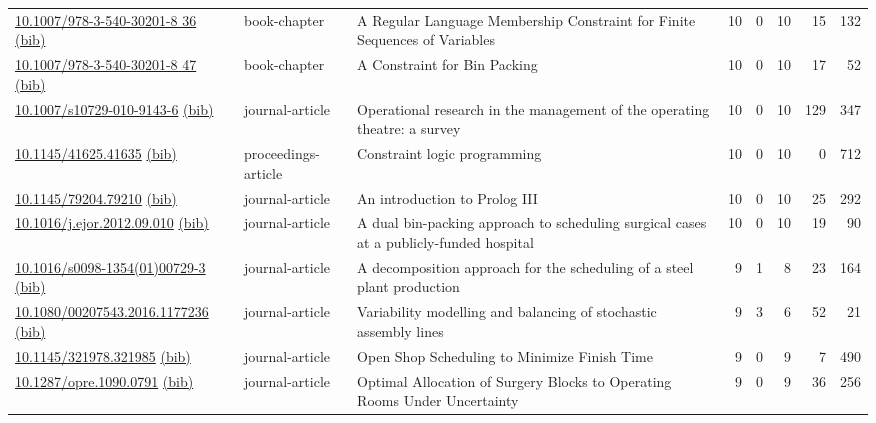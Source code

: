 {\begin{longtable}{p{5cm}lp{11cm}rrrrr}
\href{http://dx.doi.org/10.1007/978-3-540-30201-8_36}{10.1007/978-3-540-30201-8 36} \href{https://www.doi2bib.org/bib/10.1007/978-3-540-30201-8_36}{(bib)} & book-chapter & A Regular Language Membership Constraint for Finite Sequences of Variables & 10 & 0 & 10 & 15 & 132 \\
\href{http://dx.doi.org/10.1007/978-3-540-30201-8_47}{10.1007/978-3-540-30201-8 47} \href{https://www.doi2bib.org/bib/10.1007/978-3-540-30201-8_47}{(bib)} & book-chapter & A Constraint for Bin Packing & 10 & 0 & 10 & 17 & 52 \\
\href{http://dx.doi.org/10.1007/s10729-010-9143-6}{10.1007/s10729-010-9143-6} \href{https://www.doi2bib.org/bib/10.1007/s10729-010-9143-6}{(bib)} & journal-article & Operational research in the management of the operating theatre: a survey & 10 & 0 & 10 & 129 & 347 \\
\href{http://dx.doi.org/10.1145/41625.41635}{10.1145/41625.41635} \href{https://www.doi2bib.org/bib/10.1145/41625.41635}{(bib)} & proceedings-article & Constraint logic programming & 10 & 0 & 10 & 0 & 712 \\
\href{http://dx.doi.org/10.1145/79204.79210}{10.1145/79204.79210} \href{https://www.doi2bib.org/bib/10.1145/79204.79210}{(bib)} & journal-article & An introduction to Prolog III & 10 & 0 & 10 & 25 & 292 \\
\href{http://dx.doi.org/10.1016/j.ejor.2012.09.010}{10.1016/j.ejor.2012.09.010} \href{https://www.doi2bib.org/bib/10.1016/j.ejor.2012.09.010}{(bib)} & journal-article & A dual bin-packing approach to scheduling surgical cases at a publicly-funded hospital & 10 & 0 & 10 & 19 & 90 \\
\href{http://dx.doi.org/10.1016/s0098-1354(01)00729-3}{10.1016/s0098-1354(01)00729-3} \href{https://www.doi2bib.org/bib/10.1016/s0098-1354(01)00729-3}{(bib)} & journal-article & A decomposition approach for the scheduling of a steel plant production & 9 & 1 & 8 & 23 & 164 \\
\href{http://dx.doi.org/10.1080/00207543.2016.1177236}{10.1080/00207543.2016.1177236} \href{https://www.doi2bib.org/bib/10.1080/00207543.2016.1177236}{(bib)} & journal-article & Variability modelling and balancing of stochastic assembly lines & 9 & 3 & 6 & 52 & 21 \\
\href{http://dx.doi.org/10.1145/321978.321985}{10.1145/321978.321985} \href{https://www.doi2bib.org/bib/10.1145/321978.321985}{(bib)} & journal-article & Open Shop Scheduling to Minimize Finish Time & 9 & 0 & 9 & 7 & 490 \\
\href{http://dx.doi.org/10.1287/opre.1090.0791}{10.1287/opre.1090.0791} \href{https://www.doi2bib.org/bib/10.1287/opre.1090.0791}{(bib)} & journal-article & Optimal Allocation of Surgery Blocks to Operating Rooms Under Uncertainty & 9 & 0 & 9 & 36 & 256 \\

\end{longtable}}
